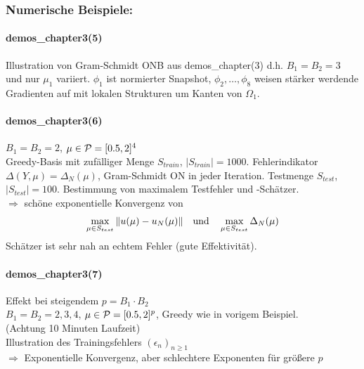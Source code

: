 \subsubsection*{Numerische Beispiele:}

\paragraph{demos\_chapter3(5)} Illustration von Gram-Schmidt ONB aus demos\_chapter(3) d.h. $B_1 = B_2 = 3$ und nur $\mu_1$ variiert.
$\phi_1$ ist normierter Snapshot, $\phi_2, \ldots, \phi_8$ weisen stärker werdende Gradienten auf mit lokalen Strukturen um Kanten von $\Omega_1$.

\paragraph{demos\_chapter3(6)} $B_1 = B_2 = 2$, $\mu \in \mathcal{P} = [0.5,2]^4$\\
Greedy-Basis mit zufälliger Menge $S_{train}$, $|S_{train}| = 1000$.
Fehlerindikator $\Delta(Y,\mu) = \Delta_N(\mu)$, Gram-Schmidt ON in jeder Iteration.
Testmenge $S_{test}$, $|S_{test}| = 100$.
Bestimmung von maximalem Testfehler und -Schätzer.\\
$\Rightarrow$ schöne exponentielle Konvergenz von
\[
	\max_{\mu \in S_{test}} \|u(\mu)-u_N(\mu)\| \quad \text{und} \quad \max_{\mu \in S_{test}} \Delta_N(\mu)
\]
Schätzer ist sehr nah an echtem Fehler (gute Effektivität).

\paragraph{demos\_chapter3(7)} Effekt bei steigendem $p = B_1 \cdot B_2$\\
$B_1 = B_2 = 2,3,4$, $\mu \in \mathcal{P} = [0.5,2]^p$, Greedy wie in vorigem Beispiel.\\
(Achtung 10 Minuten Laufzeit)\\
Illustration des Trainingsfehlers $(\epsilon_n)_{n \geq 1}$\\
$\Rightarrow$ Exponentielle Konvergenz, aber schlechtere Exponenten für größere $p$

